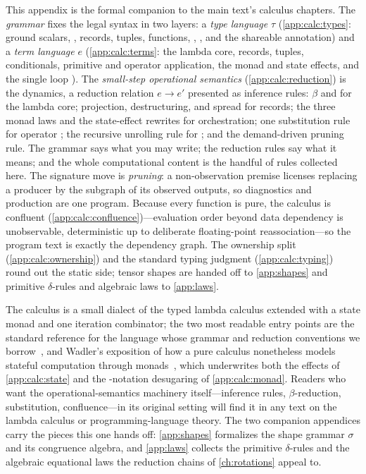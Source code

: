 \summarysection
This appendix is the formal companion to the main text's calculus chapters. The
\emph{grammar} fixes the legal syntax in two layers: a \emph{type language} $\tau$
(\cref{app:calc:types}: ground scalars, , records, tuples,
functions, , , and the \code{!} shareable
annotation) and a \emph{term language} $e$ (\cref{app:calc:terms}: the lambda core,
records, tuples, conditionals, primitive and operator application, the monad and
state effects, and the single loop ). The \emph{small-step
operational semantics} (\cref{app:calc:reduction}) is the dynamics, a reduction
relation $e \to e'$ presented as inference rules: $\beta$ and  for the
lambda core; projection, destructuring, and spread for records; the three monad
laws and the state-effect rewrites for orchestration; one substitution rule for
operator ; the recursive unrolling rule for ; and
the demand-driven pruning rule. The grammar says what you may write; the reduction
rules say what it means; and the whole computational content is the handful of
rules collected here. The signature move is \emph{pruning}: a non-observation
premise licenses replacing a producer by the subgraph of its observed outputs, so
diagnostics and production are one program. Because every function is pure, the
calculus is confluent (\cref{app:calc:confluence})---evaluation order beyond data
dependency is unobservable, deterministic up to deliberate floating-point
reassociation---so the program text is exactly the dependency graph. The ownership
split (\cref{app:calc:ownership}) and the standard typing judgment
(\cref{app:calc:typing}) round out the static side; tensor shapes are handed off
to \cref{app:shapes} and primitive $\delta$-rules and algebraic laws to
\cref{app:laws}.

\furtherreading
The calculus is a small dialect of the typed lambda calculus extended with a state
monad and one iteration combinator; the two most readable entry points are the
standard reference for the language whose grammar and reduction conventions we
borrow~\citep{peytonjones2003}, and Wadler's exposition of how a pure calculus
nonetheless models stateful computation through monads~\citep{wadler1995monads},
which underwrites both the  effects of \cref{app:calc:state} and the
-notation desugaring of \cref{app:calc:monad}. Readers who want the
operational-semantics machinery itself---inference rules, $\beta$-reduction,
substitution, confluence---in its original setting will find it in any text on the
lambda calculus or programming-language theory. The two companion appendices carry
the pieces this one hands off: \cref{app:shapes} formalizes the shape grammar
$\sigma$ and its congruence algebra, and \cref{app:laws} collects the primitive
$\delta$-rules and the algebraic equational laws the reduction chains of
\cref{ch:rotations} appeal to.
